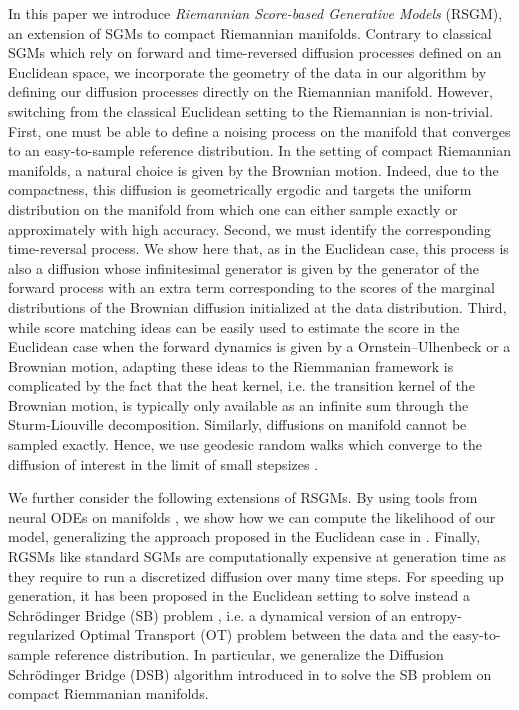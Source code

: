 In this paper we introduce \emph{Riemannian Score-based Generative Models}
(RSGM), an extension of SGMs to compact Riemannian manifolds. Contrary to
classical SGMs which rely on forward and time-reversed diffusion processes
defined on an Euclidean space, we incorporate the geometry of the data in our
algorithm by defining our diffusion processes directly on the Riemannian
manifold. However, switching from the classical Euclidean setting to the
Riemannian is non-trivial. First, one must be able to define a noising process
on the manifold that converges to an easy-to-sample reference distribution. In
the setting of compact Riemannian manifolds, a natural choice is given by the
Brownian motion. Indeed, due to the compactness, this diffusion is geometrically
ergodic and targets the uniform distribution on the manifold \citep{he2013lower}
from which one can either sample exactly or approximately with high
accuracy. Second, we must identify the corresponding time-reversal process. We
show here that, as in the Euclidean case, this process is also a diffusion whose
infinitesimal generator is given by the generator of the forward process with an
extra term corresponding to the scores of the marginal distributions of the
Brownian diffusion initialized at the data distribution. Third, while score
matching ideas \citep{hyvarinen2005estimation,vincent2011connection} can be
easily used to estimate the score in the Euclidean case when the forward
dynamics is given by a Ornstein--Ulhenbeck or a Brownian motion, adapting these
ideas to the Riemmanian framework is complicated by the fact that the heat
kernel, i.e. the transition kernel of the Brownian motion, is typically only
available as an infinite sum through the Sturm-Liouville
decomposition. Similarly, diffusions on manifold cannot be sampled
exactly. Hence, we use geodesic random walks which converge to the diffusion of
interest in the limit of small stepsizes \citep{jorgensen1975central}.

We further consider the following extensions of RSGMs. By using tools from
neural ODEs on manifolds
\citep{mathieu2020riemannian,falorsi2020neural,lou2020neural}, we show how we
can compute the likelihood of our model, generalizing the approach proposed in
the Euclidean case in
\citep{song2020score,durkan2021maximum,huang2021variational}. Finally, RGSMs
like standard SGMs are computationally expensive at generation time as they
require to run a discretized diffusion over many time steps. For speeding up
generation, it has been proposed in the Euclidean setting to solve instead a
Schr\"odinger Bridge (SB) problem
\citep{debortoli2021neurips,chen2021likelihood}, i.e. a dynamical version of
an entropy-regularized Optimal Transport (OT) problem between the data and the
easy-to-sample reference distribution. In particular, we generalize the
Diffusion Schr\"odinger Bridge (DSB) algorithm introduced in
\citep{debortoli2021neurips} to solve the SB problem on compact Riemmanian
manifolds.

